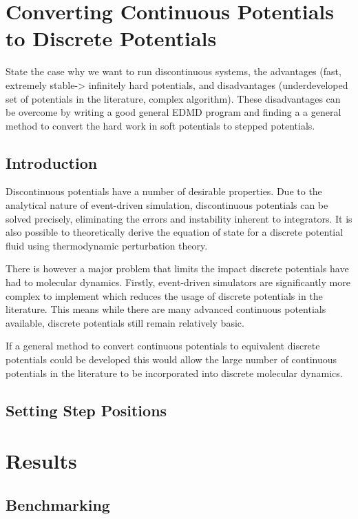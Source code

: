 \documentclass[12pt]{UoAthesis}
\begin{document}
\chapter{Converting Continuous Potentials to Discrete Potentials}
State the case why we want to run discontinuous systems, the
advantages (fast, extremely stable-> infinitely hard potentials, and
disadvantages (underdeveloped set of potentials in the literature,
complex algorithm). These disadvantages can be overcome by writing a
good general EDMD program and finding a a general method to convert
the hard work in soft potentials to stepped potentials. 

\section{Introduction}
Discontinuous potentials have a number of desirable properties.  Due
to the analytical nature of event-driven simulation, discontinuous
potentials can be solved precisely, eliminating the errors and
instability inherent to integrators. It is also possible to
theoretically derive the equation of state for a discrete potential
fluid using thermodynamic perturbation theory.

There is however a major problem that limits the impact discrete
potentials have had to molecular dynamics.  Firstly, event-driven
simulators are significantly more complex to implement which reduces
the usage of discrete potentials in the literature.  This means while
there are many advanced continuous potentials available, discrete
potentials still remain relatively basic.

If a general method to convert continuous potentials to equivalent
discrete potentials could be developed this would allow the large
number of continuous potentials in the literature to be incorporated
into discrete molecular dynamics.

\section{Setting Step Positions}


\chapter{Results} 

\section{Benchmarking} 
\end{document}
